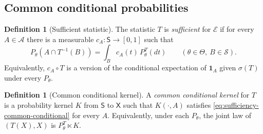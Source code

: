 \documentclass[11pt,oneside]{book}
\theoremstyle{definition}
\newtheorem{definition}[theorem]{Definition}
\theoremstyle{remark}
\begin{document}
\subsection{Common conditional probabilities}
\label{subsec:sufficient-statistic}

\begin{definition}[Sufficient statistic]
\label{def:sufficient-statistic}
The statistic $T$ is \emph{sufficient} for $\mathcal E$ if for every
$A\in\mathcal A$ there is a measurable $c_A:\mathsf S\to[0,1]$
such that
\begin{equation}
P_\theta(A\cap T^{-1}(B))=\int_B c_A(t)\,P_\theta^T(dt)
\qquad(\theta\in\Theta,\ B\in\mathcal S).
\label{eq:sufficiency-common-conditional}
\end{equation}
Equivalently, $c_A\circ T$ is a version of the conditional expectation
of $\mathbf 1_A$ given $\sigma(T)$ under every $P_\theta$.
\end{definition}

\begin{definition}[Common conditional kernel]
\label{def:common-conditional-kernel}
A \emph{common conditional kernel} for $T$ is a probability kernel
$K$ from $\mathsf S$ to $\mathsf X$ such that $K(\cdot,A)$ satisfies
\eqref{eq:sufficiency-common-conditional} for every $A$.
Equivalently, under each $P_\theta$, the joint law of $(T(X),X)$
is $P_\theta^T\ltimes K$.
\end{definition}
\end{document}
